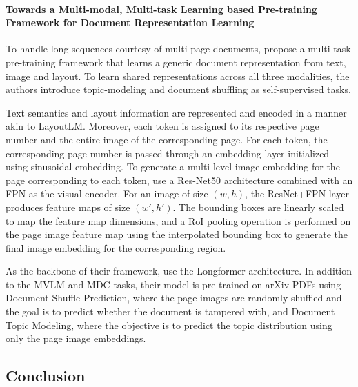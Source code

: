 
\paragraph{Towards a Multi-modal, Multi-task Learning based Pre-training Framework for Document Representation Learning} 

To handle long sequences courtesy of multi-page documents, \citet{pramanik2020towards} propose a multi-task pre-training framework that learns a generic document representation from text, image and layout. To learn shared representations across all three modalities, the authors introduce topic-modeling and document shuffling as self-supervised tasks.

Text semantics and layout information are represented and encoded in a manner akin to  LayoutLM. Moreover, each token is assigned to its respective page number and the entire image of the corresponding page. For each token, the corresponding page number is passed through an embedding layer initialized using sinusoidal embedding. To generate a multi-level image embedding for the page corresponding to each token, \citet{pramanik2020towards} use a Res-Net50 \citep{he2016deep} architecture combined with an \ac{FPN} \citep{lin2017feature} as the visual encoder. For an image of size $(w, h)$, the ResNet+FPN layer produces feature maps of size $(w', h')$. The bounding boxes are linearly scaled to map the feature map dimensions, and a \ac{RoI} pooling operation is performed on the page image feature map using the interpolated bounding box to generate the final image embedding for the corresponding region.

As the backbone of their framework, \citet{pramanik2020towards} use the Longformer architecture. In addition to the \ac{MVLM} and \ac{MDC} tasks, their model is pre-trained on arXiv PDFs \citep{arxiv2020} using Document Shuffle Prediction, where the page images are randomly shuffled and the goal is to predict whether the document is tampered with, and Document Topic Modeling, where the objective is to predict the topic distribution using only the page image embeddings.



\subsection{Conclusion}


\acresetall

